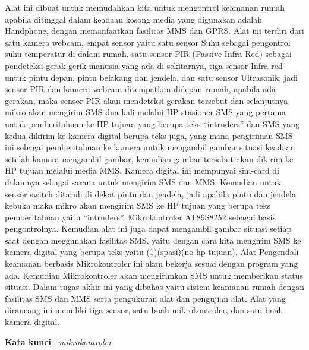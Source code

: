 \documentclass{jtetiproposalskripsi}
\begin{document}
\cover

\approvalpage


\begin{abstractind}
Alat ini dibuat untuk memudahkan kita untuk mengontrol keamanan rumah apabila ditinggal dalam keadaan kosong media yang digunakan adalah Handphone, dengan memanfaatkan fasilitas MMS dan GPRS.
             Alat ini terdiri dari satu kamera webcam, empat sensor yaitu satu sensor Suhu sebagai pengontrol suhu temperatur di dalam rumah, satu sensor PIR (Passive Infra Red) sebagai pendeteksi gerak gerik manusia yang ada di sekitarnya, tiga sensor Infra red untuk pintu depan, pintu belakang dan jendela, dan satu sensor Ultrasonik, jadi sensor PIR dan kamera webcam ditempatkan didepan rumah, apabila ada gerakan, maka sensor PIR akan mendeteksi gerakan tersebut dan selanjutnya mikro akan mengirim SMS dua kali melalui HP stasioner SMS yang pertama untuk pemberitahuan ke HP tujuan yang berupa teks “intruders” dan SMS yang kedua dikirim ke kamera digital berupa teks juga, yang mana pengiriman SMS ini sebagai pemberitahuan ke kamera untuk mengambil gambar situasi keadaan setelah kamera mengambil gambar, kemudian gambar tersebut akan dikirim ke HP tujuan melalui media MMS. 
             Kamera digital ini mempunyai sim-card di dalamnya sebagai sarana untuk mengirim SMS dan MMS. Kemudian untuk sensor switch ditaruh di dekat pintu dan jendela, jadi apabila pintu dan jendela kebuka maka mikro akan mengirim SMS ke HP tujuan yang berupa teks pemberitahuan yaitu “intruders”.
              Mikrokontroler AT89S8252 sebagai basis pengontrolnya. Kemudian alat ini juga dapat mengambil gambar situasi setiap saat dengan meggunakan fasilitas SMS, yaitu dengan cara kita mengirim SMS ke kamera digital yang berupa teks yaitu (1)(spasi)(no hp tujuan). 
             Alat Pengendali keamanan berbasis Mikrokontroler ini akan bekerja sesuai dengan program yang ada. Kemudian Mikrokontroler akan mengirimkan SMS untuk memberikan status situasi. Dalam tugas akhir ini  yang dibahas yaitu  sistem keamanan rumah dengan fasilitas SMS dan MMS serta pengukuran alat dan pengujian alat.
            Alat yang dirancang ini memiliki tiga sensor, satu buah mikrokontroler, dan satu buah kamera digital.


 


\bigskip
\textbf{Kata kunci} : \emph{mikrokontroler}
\end{abstractind}
\end{document}
